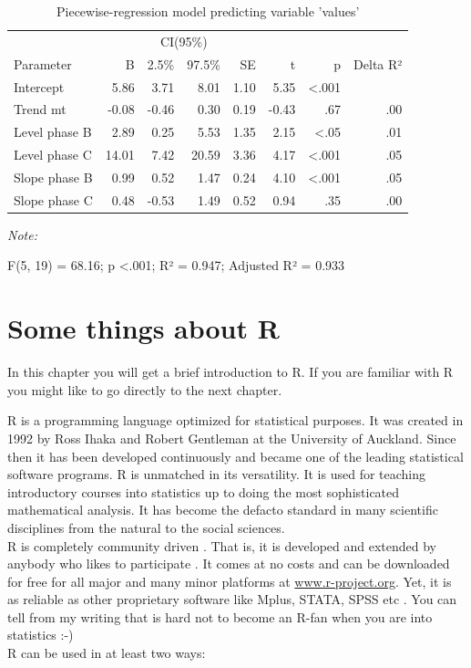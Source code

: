 \documentclass[
]{book}
\begin{document}
\begin{table}[!h]

\caption{\label{tab:plm-strange-study}Piecewise-regression model predicting variable 'values'}
\begin{threeparttable}
\begin{tabular}[t]{lrrrrrrr}
\toprule
\multicolumn{2}{c}{ } & \multicolumn{2}{c}{CI(95\%)} & \multicolumn{4}{c}{ } \\
\cmidrule(l{3pt}r{3pt}){3-4}
Parameter & B & 2.5\% & 97.5\% & SE & t & p & Delta R²\\
\midrule
Intercept & 5.86 & 3.71 & 8.01 & 1.10 & 5.35 & <.001 & \\
Trend mt & -0.08 & -0.46 & 0.30 & 0.19 & -0.43 & .67 & .00\\
Level phase B & 2.89 & 0.25 & 5.53 & 1.35 & 2.15 & <.05 & .01\\
Level phase C & 14.01 & 7.42 & 20.59 & 3.36 & 4.17 & <.001 & .05\\
Slope phase B & 0.99 & 0.52 & 1.47 & 0.24 & 4.10 & <.001 & .05\\
Slope phase C & 0.48 & -0.53 & 1.49 & 0.52 & 0.94 & .35 & .00\\
\bottomrule
\end{tabular}
\begin{tablenotes}
\item \textit{Note: } 
\item F(5, 19) = 68.16; p <.001; R² = 0.947; Adjusted R² = 0.933
\end{tablenotes}
\end{threeparttable}
\end{table}

\hypertarget{some-things-about-r}{%
\chapter{Some things about R}\label{some-things-about-r}}

In this chapter you will get a brief introduction to R. If you are familiar with R you might like to go directly to the next chapter.

\hfill\break
R is a programming language optimized for statistical purposes. It was created in 1992 by Ross Ihaka and Robert Gentleman at the University of Auckland. Since then it has been developed continuously and became one of the leading statistical software programs. R is unmatched in its versatility. It is used for teaching introductory courses into statistics up to doing the most sophisticated mathematical analysis. It has become the defacto standard in many scientific disciplines from the natural to the social sciences.\\
R is completely community driven . That is, it is developed and extended by anybody who likes to participate . It comes at no costs and can be downloaded for free for all major and many minor platforms at \href{http://www.r-project.org}{www.r-project.org}. Yet, it is as reliable as other proprietary software like Mplus, STATA, SPSS etc . You can tell from my writing that is hard not to become an R-fan when you are into statistics :-)\\
R can be used in at least two ways:
\end{document}
